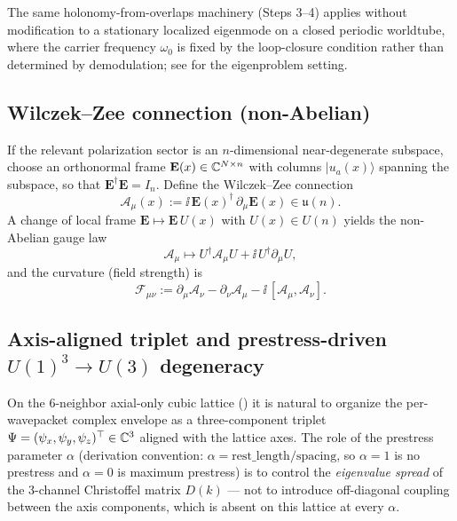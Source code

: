 The same holonomy-from-overlaps machinery (Steps 3--4) applies without modification to a stationary localized
eigenmode on a closed periodic worldtube, where the carrier frequency $\omega_0$ is fixed by the loop-closure
condition rather than determined by demodulation; see  for the eigenproblem setting.

\subsection{Wilczek--Zee connection (non-Abelian)}

If the relevant polarization sector is an $n$-dimensional near-degenerate subspace, choose an orthonormal
frame $\mathbf{E}(x)\in\mathbb{C}^{N\times n}$ with columns $\lvert u_a(x)\rangle$ spanning the subspace, so that
$\mathbf{E}^\dagger\mathbf{E}=I_n$.
Define the Wilczek--Zee connection
\begin{equation}
  \mathcal{A}_\mu(x) := \ii\,\mathbf{E}(x)^\dagger\,\partial_\mu \mathbf{E}(x)\in\mathfrak{u}(n).
  \label{eq:wz-connection}
\end{equation}
A change of local frame $\mathbf{E}\mapsto \mathbf{E}\,U(x)$ with $U(x)\in U(n)$ yields the non-Abelian gauge law
\begin{equation}
  \mathcal{A}_\mu \mapsto U^\dagger \mathcal{A}_\mu U + \ii\,U^\dagger \partial_\mu U,
  \label{eq:wz-gauge}
\end{equation}
and the curvature (field strength) is
\begin{equation}
  \mathcal{F}_{\mu\nu}
  := \partial_\mu \mathcal{A}_\nu-\partial_\nu \mathcal{A}_\mu
     -\ii\,[\mathcal{A}_\mu,\mathcal{A}_\nu].
  \label{eq:wz-curvature}
\end{equation}

\subsection{\texorpdfstring{Axis-aligned triplet and prestress-driven $U(1)^3\rightarrow U(3)$ degeneracy}{Axis-aligned triplet and prestress-driven U(1)^3 -> U(3) degeneracy}}
\label{subsec:axis-triplet}

On the 6-neighbor axial-only cubic lattice () it is natural to organize the
per-wavepacket complex envelope as a three-component triplet $\Psi=(\psi_x,\psi_y,\psi_z)^\top\in\mathbb{C}^3$ aligned with the
lattice axes.
The role of the prestress parameter $\alpha$ (derivation convention: $\alpha = \mathrm{rest\_length}/\mathrm{spacing}$,
so $\alpha = 1$ is no prestress and $\alpha = 0$ is maximum prestress) is to control the \emph{eigenvalue spread} of the
3-channel Christoffel matrix $D(k)$ — not to introduce off-diagonal coupling between the axis components, which is
absent on this lattice at every $\alpha$.

